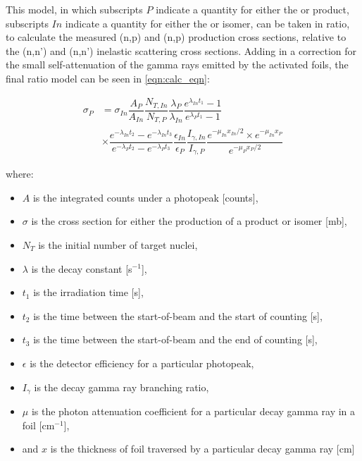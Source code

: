 \documentclass[5p]{elsarticle}
\begin{document}
This model, in which subscripts $P$ indicate a quantity for either the  or  product, subscripts $In$ indicate a quantity for either the  or  isomer, can be taken in ratio, to calculate the measured (n,p) and (n,p) production cross sections, relative to the (n,n') and (n,n') inelastic scattering cross sections. Adding in a correction for the small self-attenuation of the gamma rays emitted by the activated foils, the final ratio model can be seen in \autoref{eqn:calc_eqn}:

\begin{align}\label{eqn:calc_eqn}
\sigma_P &= \sigma_{In} \dfrac{A_P}{A_{In}} \dfrac{N_{T,In}}{N_{T,P}} \dfrac{\lambda_P}{\lambda_{In}} \dfrac{e^{\lambda_{In}t_1}-1}{e^{\lambda_{P}t_1}-1}  \\
&\times \dfrac{e^{-\lambda_{In}t_2}-e^{-\lambda_{In}t_3}}{e^{-\lambda_{P}t_2} - e^{-\lambda_{P}t_3}} \dfrac{\epsilon_{In}}{\epsilon_P}  \dfrac{I_{\gamma,In}}{I_{\gamma,P}} \dfrac{e^{-\mu_{In}x_{In}/2}\times e^{-\mu_{In}x_{P}}}{e^{-\mu_{P}x_{P}/2}} \nonumber
\end{align}

where:

\begin{itemize}
  

\item $A$ is the integrated counts under a photopeak [counts],

\item $\sigma$ is the cross section for either the production of a product or isomer [mb],

\item $N_T$ is the initial number of target nuclei,

\item $\lambda$  is the decay constant [s$^{-1}$],

\item $t_1$ is the irradiation time [s],

\item $t_2$ is the time between the start-of-beam and the start of counting [s],

\item $t_3$ is the time  between the start-of-beam and the end of counting [s],

\item $\epsilon$ is the  detector efficiency for a particular photopeak,

\item $I_\gamma$ is the decay gamma ray branching ratio,

\item $\mu$ is the photon attenuation coefficient for a particular decay gamma ray in a foil [cm$^{-1}$],

\item and $x$ is the thickness of foil traversed by a particular decay gamma ray [cm] 
\end{itemize}
\end{document}
